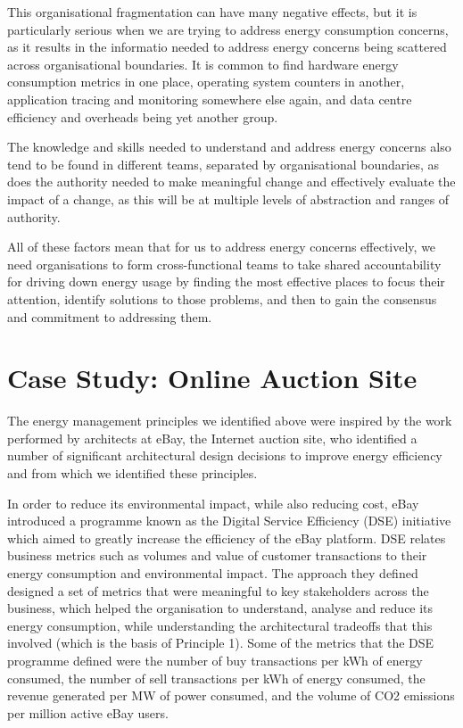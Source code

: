 This organisational fragmentation can have many negative effects, but it is particularly serious when we are trying to address energy consumption concerns, as it results in the informatio needed to address energy concerns being scattered across organisational boundaries.  It is common to find hardware energy consumption metrics in one place, operating system counters in another, application tracing and monitoring somewhere else again, and data centre efficiency and overheads being yet another group.

The knowledge and skills needed to understand and address energy concerns also tend to be found in different teams, separated by organisational boundaries, as does the authority needed to make meaningful change and effectively evaluate the impact of a change, as this will be at multiple levels of abstraction and ranges of authority.

All of these factors mean that for us to address energy concerns effectively, we need organisations to form cross-functional teams to take shared accountability for driving down energy usage by finding the most effective places to focus their attention, identify solutions to those problems, and then to gain the consensus and commitment to addressing them.

\section{Case Study: Online Auction Site}

The energy management principles we identified above were inspired by the work performed by architects at eBay, the Internet auction site, who identified a number of significant architectural design decisions to improve energy efficiency and from which we identified these principles.

In order to reduce its environmental impact, while also reducing cost, eBay introduced a programme known as the Digital Service Efficiency (DSE) initiative \cite{ebay2013-digitalefficiency} which aimed to greatly increase the efficiency of the eBay platform. DSE relates business metrics such as volumes and value of customer transactions to their energy consumption and environmental impact.   The approach they defined designed a set of metrics that were meaningful to key stakeholders across the business, which helped the organisation to understand, analyse and reduce its energy consumption, while understanding the architectural tradeoffs that this involved (which is the basis of Principle 1). Some of the metrics that the DSE programme defined were the number of buy transactions per kWh of energy consumed, the number of sell transactions per kWh of energy consumed, the revenue generated per MW of power consumed, and the volume of CO2 emissions per million active eBay users.

